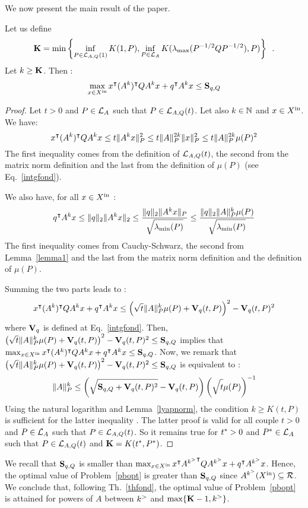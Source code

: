 \documentclass[10pt]{article}
\begin{document}
We now present the main result of the paper.
\begin{theorem}
\label{thfond}
Let us define \[\mathbf{K}=\min\left\{\inf_{P\in\mathcal{L}_{A,Q}(1)} K(1,P),\inf_{P\in\mathcal{L}_{A}} K(\lambda_{\operatorname{max}}(P^{-1/2}QP^{-1/2}),P)\right\}\enspace .\] Let $k\geq \mathbf{K}$. Then : 
\[
\max_{x\in X^\mathrm{in}} x^\intercal (A^k)^\intercal Q A^k x+q^\intercal A^k x\leq \mathbf{S}_{q,Q}
\]
\end{theorem}

\begin{proof}
Let $t>0$ and $P\in\mathcal{L}_{A}$ such that $P\in\mathcal{L}_{A,Q}(t)$. Let also $k\in\mathbb{N}$ and $x\in X^\mathrm{in}$. We have:
\[
x^\intercal (A^k)^\intercal Q A^k x  
\leq  t \| A^k x\|_P^2\leq t\| A\|^{2k}_P \| x\|^2_P
\leq t\| A\|_P^{2k} \mu(P)^2
\]
The first inequality comes from the definition of $\mathcal{L}_{A,Q}(t)$, the second from the matrix norm definition and the last from the definition of $\mu(P)$ (see Eq.~\eqref{intgfond}).

We also have, for all $x\in X^\mathrm{in}$ :
\[
q^\intercal A^k x
\leq \| q\|_2 \| A^k x\|_2\leq \dfrac{\| q\|_2 \| A^k x\|_P}{\sqrt{\strut \lambda_{\operatorname{min}}(P)}} 
\leq \dfrac{\| q\|_2\| A\|_P^{k} \mu(P)}{\sqrt{\strut \lambda_{\operatorname{min}}(P)}}
\]
The first inequality comes from Cauchy-Schwarz, the second from Lemma~\ref{lemma1} and the last from the matrix norm definition and the definition of $\mu(P)$. 

Summing the two parts leads to :
\[
x^\intercal (A^k)^\intercal Q A^k x+q^\intercal A^k x\leq \left(\sqrt{t}\| A\|_P^k\mu(P)+\mathbf{V}_{q}(t,P)\right)^2-\mathbf{V}_{q}(t,P)^2
\]
where $\mathbf{V}_{q}$ is defined at Eq.~\eqref{intgfond}. Then, $ \left(\sqrt{t}\| A\|_P^k\mu(P)+\mathbf{V}_{q}(t,P)\right)^2-\mathbf{V}_{q}(t,P)^2\leq \mathbf{S}_{q,Q}$ implies that $ \max_{x\in X^\mathrm{in}} x^\intercal (A^k)^\intercal Q A^k x+q^\intercal A^k x\leq \mathbf{S}_{q,Q}$. Now, we remark that  $\left(\sqrt{t}\| A\|_P^k\mu(P)+\mathbf{V}_{q}(t,P)\right)^2-\mathbf{V}_{q}(t,P)^2\leq \mathbf{S}_{q,Q}$ is equivalent to :
\[
\| A\|_P^k\leq \left(\sqrt{\strut \mathbf{S}_{q,Q}+\mathbf{V}_{q}(t,P)^2}-\mathbf{V}_{q}(t,P)\right)\left(\sqrt{\strut t}\mu(P)\right)^{-1}
\]
Using the natural logarithm and Lemma~\ref{lyapnorm}, the condition  $k\geq K(t,P)$ is sufficient for the latter inequality .  The latter proof is valid for all couple $t>0$ and $P\in\mathcal{L}_{A}$ such that $P\in\mathcal{L}_{A,Q}(t)$. So it remains true for   $t^*>0$ and $P^*\in\mathcal{L}_{A}$ such that $P\in\mathcal{L}_{A,Q}(t)$ and $\mathbf{K}=K(t^*,P^*)$. 
\end{proof}
We recall that $\mathbf{S}_{q,Q}$ is smaller than $\max_{x\in X^\mathrm{in}} x^\intercal {A^{k^{>}}}^\intercal Q A^{k^{>}} x+q^\intercal A^{k^{>}} x$. Hence, the optimal value of Problem~\ref{pbopt} is greater than $\mathbf{S}_{q,Q}$ since $A^{k^{>}} (X^\mathrm{in})\subseteq \mathcal{R}$. We conclude that, following Th.~\ref{thfond}, the optimal value of Problem~\ref{pbopt} is attained for powers of $A$ between $k^{>}$  and $\max\{\mathbf{K}-1,k^{>}\}$.
\end{document}
